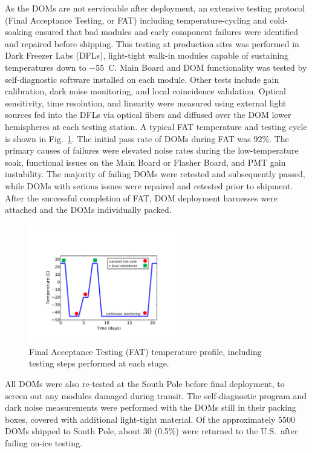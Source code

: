 As the DOMs are not serviceable after deployment, an extensive testing
protocol (Final Acceptance Testing, or FAT) including temperature-cycling
and cold-soaking ensured that bad modules and early component failures were
identified and repaired before shipping.  This testing at production sites
was performed in Dark Freezer Labs (DFLs), light-tight walk-in 
modules capable of sustaining temperatures down to \SI{-55}{C}.  Main Board
and DOM functionality was tested by self-diagnostic software installed on
each module.  Other tests include gain calibration, dark noise monitoring,
and local coincidence validation.  Optical sensitivity, time resolution,
and linearity were measured using external light sources fed into the DFLs
via optical fibers and diffused over the DOM lower hemispheres at each
testing station.  A typical FAT temperature and testing cycle is shown in
Fig.~\ref{fig:fat_cycle}. The initial pass rate of DOMs during FAT was
92\%.  The primary causes of failures were elevated noise rates during the
low-temperature soak, functional issues on the Main Board or Flasher Board,
and PMT gain instability.  The majority of failing DOMs were retested and
subsequently passed, while DOMs with serious issues were repaired and
retested prior to shipment. After the successful completion of FAT, DOM
deployment harnesses were attached and the DOMs individually packed. 

\begin{figure}[!h]
 \centering
 \includegraphics[width=0.6\textwidth]{graphics/dom/production/fat_cycle.pdf}
 \caption{Final Acceptance Testing (FAT) temperature profile, including
   testing steps performed at each stage.}
 \label{fig:fat_cycle}
\end{figure}

All DOMs were also re-tested at the South Pole before final deployment, to
screen out any modules damaged during transit.  The self-diagnostic
program and dark noise measurements were performed with the DOMs still in
their packing boxes, covered with additional light-tight material.  Of the
approximately 5500 DOMs shipped to South Pole, about 30 (0.5\%) were
returned to the U.S.~after failing on-ice testing.    

